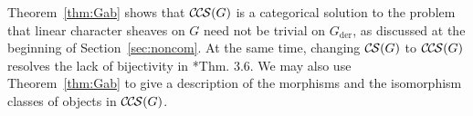 \documentclass[10pt]{amsart}
\theoremstyle{plain}
\newtheorem{lemma}[theorem]{Lemma}
\theoremstyle{definition}
\newcommand{\EE}{\mathbb{\bar Q}_\ell}
\newcommand{\Fq}{k}
\DeclareMathOperator{\id}{id}
\newcommand{\der}{_{\operatorname{der}}}
\newcommand{\cs}[1]{{\mathcal{#1}}}
\newcommand{\CS}{{\mathcal{C\hskip-0.8pt S}}}
\newcommand{\CCS}{{\mathcal{C\hskip-.8pt C\hskip-0.8pt S}}}
\begin{document}
%
%


Theorem~\ref{thm:Gab} shows that $\CCS(G)$ is a categorical solution to the problem that linear character sheaves on $G$ need not be trivial on $G\der$, as discussed at the beginning of Section~\ref{sec:noncom}.  At the same time, changing $\CS(G)$ to $\CCS(G)$ resolves the lack of bijectivity in \cite{cunningham-roe:13a}*{Thm. 3.6}.
%
We may also use Theorem~\ref{thm:Gab} to give a description of the morphisms and the isomorphism classes of objects in $\CCS(G)$. 
\end{document}
